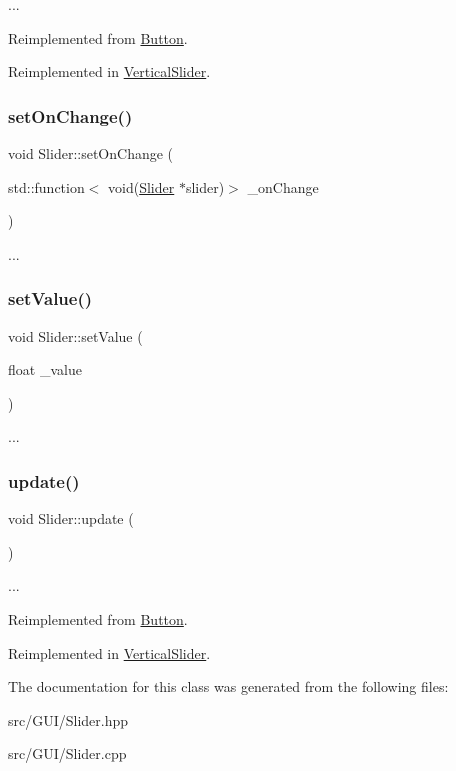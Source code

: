 ... 

Reimplemented from \hyperlink{class_button_a6e7c3b800fae0b1e7765ccdafc88c28e}{Button}.



Reimplemented in \hyperlink{class_vertical_slider_a35b7771bd63647aa288f16719611b567}{Vertical\+Slider}.

\mbox{\label{class_slider_a2c072af3ce9213e5a097da49d1af8a82}} 
\subsubsection{\texorpdfstring{set\+On\+Change()}{setOnChange()}}
{\footnotesize\ttfamily void Slider\+::set\+On\+Change (\begin{DoxyParamCaption}\item[{std\+::function$<$ void(\hyperlink{class_slider}{Slider} $\ast$slider)$>$}]{\+\_\+on\+Change }\end{DoxyParamCaption})}

... \mbox{\label{class_slider_a2b857d6483469bde177871f38e47097e}} 
\subsubsection{\texorpdfstring{set\+Value()}{setValue()}}
{\footnotesize\ttfamily void Slider\+::set\+Value (\begin{DoxyParamCaption}\item[{float}]{\+\_\+value }\end{DoxyParamCaption})}

... \mbox{\label{class_slider_a8bcc94829fa9c1546097da4e797665cb}} 
\subsubsection{\texorpdfstring{update()}{update()}}
{\footnotesize\ttfamily void Slider\+::update (\begin{DoxyParamCaption}{ }\end{DoxyParamCaption})\hspace{0.3cm}{\ttfamily [virtual]}}

... 

Reimplemented from \hyperlink{class_button_ad8e030c1c8846d43f3126047d4a3667f}{Button}.



Reimplemented in \hyperlink{class_vertical_slider_ae868b87e37fbdac6e4906ac6b9ad465d}{Vertical\+Slider}.



The documentation for this class was generated from the following files\+:\begin{DoxyCompactItemize}
\item 
src/\+G\+U\+I/Slider.\+hpp\item 
src/\+G\+U\+I/Slider.\+cpp\end{DoxyCompactItemize}
